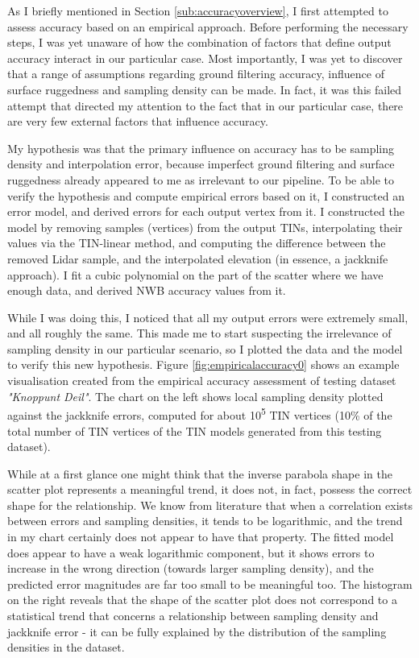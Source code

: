As I briefly mentioned in Section \ref{sub:accuracyoverview}, I first attempted to assess accuracy based on an empirical approach. Before performing the necessary steps, I was yet unaware of how the combination of factors that define output accuracy interact in our particular case. Most importantly, I was yet to discover that a range of assumptions regarding ground filtering accuracy, influence of surface ruggedness and sampling density can be made. In fact, it was this failed attempt that directed my attention to the fact that in our particular case, there are very few external factors that influence accuracy.

My hypothesis was that the primary influence on accuracy has to be sampling density and interpolation error, because imperfect ground filtering and surface ruggedness already appeared to me as irrelevant to our pipeline. To be able to verify the hypothesis and compute empirical errors based on it, I constructed an error model, and derived errors for each output vertex from it. I constructed the model by removing samples (vertices) from the output TINs, interpolating their values via the TIN-linear method, and computing the difference between the removed Lidar sample, and the interpolated elevation (in essence, a jackknife approach). I fit a cubic polynomial on the part of the scatter where we have enough data, and derived NWB accuracy values from it.

While I was doing this, I noticed that all my output errors were extremely small, and all roughly the same. This made me to start suspecting the irrelevance of sampling density in our particular scenario, so I plotted the data and the model to verify this new hypothesis. Figure \ref{fig:empiricalaccuracy0} shows an example visualisation created from the empirical accuracy assessment of testing dataset \textit{"Knoppunt Deil"}. The chart on the left shows local sampling density plotted against the jackknife errors, computed for about 10\textsuperscript{5} TIN vertices (10\% of the total number of TIN vertices of the TIN models generated from this testing dataset).

While at a first glance one might think that the inverse parabola shape in the scatter plot represents a meaningful trend, it does not, in fact, possess the correct shape for the relationship. We know from literature that when a correlation exists between errors and sampling densities, it tends to be logarithmic, and the trend in my chart certainly does not appear to have that property. The fitted model does appear to have a weak logarithmic component, but it shows errors to increase in the wrong direction (towards larger sampling density), and the predicted error magnitudes are far too small to be meaningful too. The histogram on the right reveals that the shape of the scatter plot does not correspond to a statistical trend that concerns a relationship between sampling density and jackknife error - it can be fully explained by the distribution of the sampling densities in the dataset.

